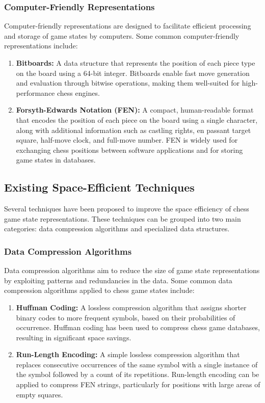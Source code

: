 \documentclass{article}
\begin{document}
\subsubsection{Computer-Friendly Representations}  
Computer-friendly representations are designed to facilitate efficient processing and storage of game states by computers. Some common computer-friendly representations include:  
   
\begin{enumerate}  
  \item \textbf{Bitboards:} A data structure that represents the position of each piece type on the board using a 64-bit integer. Bitboards enable fast move generation and evaluation through bitwise operations, making them well-suited for high-performance chess engines.  
    
  \item \textbf{Forsyth-Edwards Notation (FEN):} A compact, human-readable format that encodes the position of each piece on the board using a single character, along with additional information such as castling rights, en passant target square, half-move clock, and full-move number. FEN is widely used for exchanging chess positions between software applications and for storing game states in databases.  
\end{enumerate}  
\newpage

\subsection{Existing Space-Efficient Techniques}  
Several techniques have been proposed to improve the space efficiency of chess game state representations. These techniques can be grouped into two main categories: data compression algorithms and specialized data structures.  
   
\subsubsection{Data Compression Algorithms}  
Data compression algorithms aim to reduce the size of game state representations by exploiting patterns and redundancies in the data. Some common data compression algorithms applied to chess game states include:  
   
\begin{enumerate}  
  \item \textbf{Huffman Coding:} A lossless compression algorithm that assigns shorter binary codes to more frequent symbols, based on their probabilities of occurrence. Huffman coding has been used to compress chess game databases, resulting in significant space savings.  
    
  \item \textbf{Run-Length Encoding:} A simple lossless compression algorithm that replaces consecutive occurrences of the same symbol with a single instance of the symbol followed by a count of its repetitions. Run-length encoding can be applied to compress FEN strings, particularly for positions with large areas of empty squares.  
\end{enumerate}  
   
\end{document}
